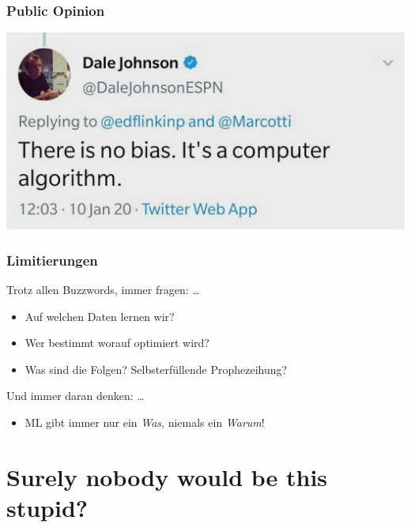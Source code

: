 \documentclass[aspectratio=43,x11names]{beamer}
\begin{document}
\begin{frame}
\frametitle{Public Opinion}
\begin{center}
\includegraphics[width=\textwidth,keepaspectratio]{images/no_bias.jpeg} 
\end{center}
\end{frame}

\begin{frame}
\frametitle{Limitierungen}

Trotz allen Buzzwords, immer fragen: \dots \bigskip

\begin{itemize}
\pause\item Auf welchen Daten lernen wir?\\

\pause\item Wer bestimmt worauf optimiert wird?\\

\pause\item Was sind die Folgen? Selbsterfüllende Prophezeihung?\\
\end{itemize}

\pause\bigskip

Und immer daran denken: \dots
\begin{itemize}
\item ML gibt immer nur ein \emph{Was}, niemals ein \emph{Warum}!
\end{itemize}
\end{frame}


\section{Surely nobody would be this stupid?}
\end{document}
